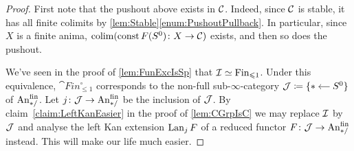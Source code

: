 \begin{proof}%
	First note that the pushout above exists in $\mathcal{C}$. Indeed, since $\mathcal{C}$ is stable, it has all finite colimits by \cref{lem:Stable}\cref{enum:PushoutPullback}. In particular, since $X$ is a finite anima, $\operatorname*{colim}(\operatorname{const} F(S^0)\colon X\rightarrow \mathcal{C})$ exists, and then so does the pushout.
	
	We've seen in the proof of \cref{lem:FunExcIsSp} that $\mathcal{I}\simeq \mathrm{Fin}_{\leqslant 1}$. Under this equivalence, $\cat{Fin}_{\leqslant1}^\circ$ corresponds to the non-full sub-$\infty$-category $\Jj\coloneqq \{\begin{tikzcd}[cramped, column sep=small,ampersand replacement=\&]*\&\lar S^0\end{tikzcd}\}$ of $\FinAn$. Let $j\colon \Jj\rightarrow \FinAn$ be the inclusion of $\mathcal{J}$. By claim~\cref{claim:LeftKanEasier} in the proof of \cref{lem:CGrpIsC} we may replace $\mathcal{I}$ by $\mathcal{J}$ and analyse the left Kan extension $\operatorname{Lan}_jF$ of a reduced functor $F\colon \Jj\rightarrow \FinAn$ instead. This will make our life much easier.
	

\end{proof}
